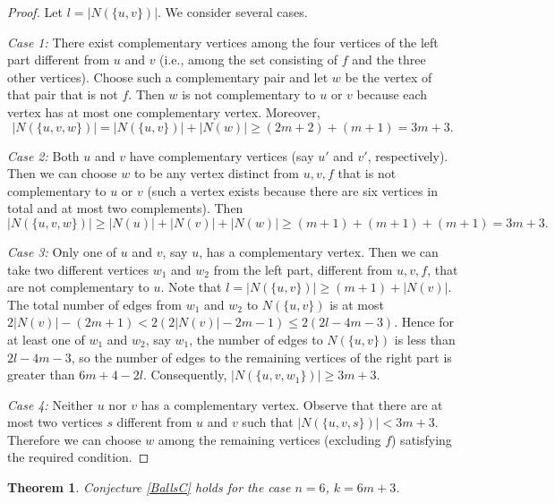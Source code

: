 \documentclass[12pt]{article}
\newtheorem{theorem}{Theorem}
\theoremstyle{definition}
\theoremstyle{plain}
\renewcommand{\le}{\leqslant}
\renewcommand{\ge}{\geqslant}
\begin{document}
\begin{proof}
Let $l = |N(\{u,v\})|$. We consider several cases.

\emph{Case 1:} There exist complementary vertices among the four vertices of the left part different from $u$ and $v$ (i.e., among the set consisting of $f$ and the three other vertices). Choose such a complementary pair and let $w$ be the vertex of that pair that is not $f$. Then $w$ is not complementary to $u$ or $v$ because each vertex has at most one complementary vertex. Moreover,
\[
|N(\{u,v,w\})| = |N(\{u,v\})| + |N(w)| \ge (2m+2) + (m+1) = 3m+3.
\]

\emph{Case 2:} Both $u$ and $v$ have complementary vertices (say $u'$ and $v'$, respectively). Then we can choose $w$ to be any vertex distinct from $u,v,f$ that is not complementary to $u$ or $v$ (such a vertex exists because there are six vertices in total and at most two complements). Then
\[
|N(\{u,v,w\})| \ge |N(u)| + |N(v)| + |N(w)| \ge (m+1) + (m+1) + (m+1) = 3m+3.
\]

\emph{Case 3:} Only one of $u$ and $v$, say $u$, has a complementary vertex. Then we can take two different vertices $w_1$ and $w_2$ from the left part, different from $u,v,f$, that are not complementary to $u$. Note that $l = |N(\{u,v\})| \ge (m+1) + |N(v)|$. The total number of edges from $w_1$ and $w_2$ to $N(\{u,v\})$ is at most $2|N(v)| - (2m+1) < 2(2|N(v)| - 2m - 1) \le 2(2l - 4m - 3)$. Hence for at least one of $w_1$ and $w_2$, say $w_1$, the number of edges to $N(\{u,v\})$ is less than $2l - 4m - 3$, so the number of edges to the remaining vertices of the right part is greater than $6m+4 - 2l$. Consequently, $|N(\{u,v,w_1\})| \ge 3m+3$.

\emph{Case 4:} Neither $u$ nor $v$ has a complementary vertex. Observe that there are at most two vertices $s$ different from $u$ and $v$ such that $|N(\{u,v,s\})| < 3m+3$. Therefore we can choose $w$ among the remaining vertices (excluding $f$) satisfying the required condition.
\end{proof}

\begin{theorem}
Conjecture \ref{BallsC} holds for the case $n=6$, $k = 6m+3$.
\end{theorem}
\end{document}
